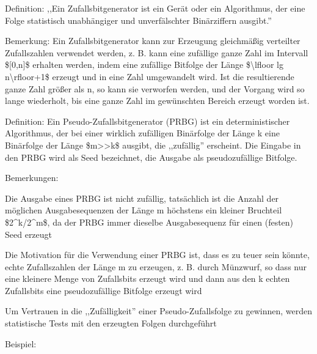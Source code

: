 \documentclass[a4paper]{article}
\begin{document}
\begin{multicols}{3}
      \begin{itemize*}
            \item
            Definition: ,,Ein Zufallsbitgenerator ist ein Gerät oder ein
            Algorithmus, der eine Folge statistisch unabhängiger und
            unverfälschter Binärziffern ausgibt.''
            \item
            Bemerkung: Ein Zufallsbitgenerator kann zur Erzeugung gleichmäßig
            verteilter Zufallszahlen verwendet werden, z. B. kann eine zufällige
            ganze Zahl im Intervall \${[}0,n{]}\$ erhalten werden, indem eine
            zufällige Bitfolge der Länge \$\textbackslash lfloor lg
            n\textbackslash rfloor+1\$ erzeugt und in eine Zahl umgewandelt wird.
            Ist die resultierende ganze Zahl größer als n, so kann sie verworfen
            werden, und der Vorgang wird so lange wiederholt, bis eine ganze Zahl
            im gewünschten Bereich erzeugt worden ist.
            \item
            Definition: Ein Pseudo-Zufallsbitgenerator (PRBG) ist ein
            deterministischer Algorithmus, der bei einer wirklich zufälligen
            Binärfolge der Länge k eine Binärfolge der Länge
            \$m\textgreater\textgreater k\$ ausgibt, die ,,zufällig'' erscheint.
            Die Eingabe in den PRBG wird als Seed bezeichnet, die Ausgabe als
            pseudozufällige Bitfolge.
            \item
            Bemerkungen:

            \begin{itemize*}
                  \item Die Ausgabe eines PRBG ist nicht zufällig, tatsächlich ist die Anzahl der möglichen Ausgabesequenzen der Länge m höchstens ein kleiner Bruchteil \$2\^{}k/2\^{}m\$, da der PRBG immer dieselbe Ausgabesequenz für einen (festen) Seed erzeugt
                  \item Die Motivation für die Verwendung einer PRBG ist, dass es zu teuer sein könnte, echte Zufallszahlen der Länge m zu erzeugen, z. B. durch Münzwurf, so dass nur eine kleinere Menge von Zufallsbits erzeugt wird und dann aus den k echten Zufallsbits eine pseudozufällige Bitfolge erzeugt wird
                  \item Um Vertrauen in die ,,Zufälligkeit'' einer Pseudo-Zufallsfolge zu gewinnen, werden statistische Tests mit den erzeugten Folgen durchgeführt
            \end{itemize*}
            \item
            Beispiel:


\end{itemize*}
\end{multicols}
\end{document}
